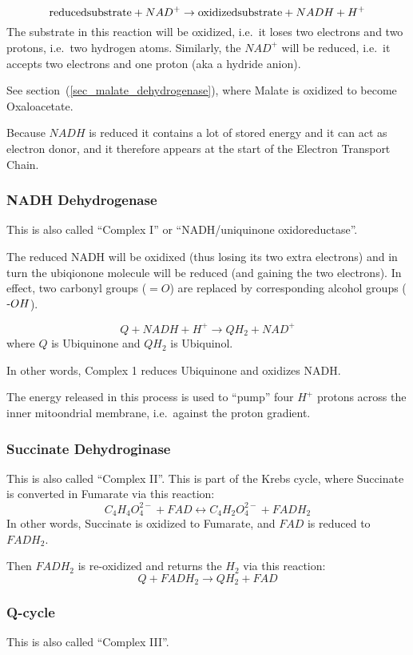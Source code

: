 \documentclass{article}
\def\mhyphen{{\hbox{-}}}
\begin{document}
\[
    {\rm reduced substrate} + NAD^+ \rightarrow {\rm oxidized substrate} + NADH + H^+
\]
The substrate in this reaction will be oxidized, i.e.\ it loses two electrons and two
protons, i.e.\ two hydrogen atoms. Similarly, the $NAD^+$ will be reduced, i.e.\ it
accepts two electrons and one proton (aka a hydride anion).

See section~(\ref{sec_malate_dehydrogenase}), where Malate is oxidized to become
Oxaloacetate.

Because $NADH$ is reduced it contains a lot of stored energy and it can act as electron
donor, and it therefore appears at the start of the Electron Transport Chain.

\subsubsection{NADH Dehydrogenase}
This is also called ``Complex I'' or ``NADH/uniquinone oxidoreductase''.

The reduced NADH will be oxidixed (thus losing its two extra electrons) and in turn
the ubiqionone molecule will be reduced (and gaining the two electrons).
In effect, two carbonyl groups ($=O$) are replaced by corresponding alcohol groups
(${\mhyphen}OH$).

\[
    Q + NADH + H^+ \rightarrow QH_2 + NAD^+
\]
where $Q$ is Ubiquinone and $QH_2$ is Ubiquinol.

In other words, Complex 1 reduces Ubiquinone and oxidizes NADH\@.

The energy released in this process is used to ``pump'' four $H^+$ protons across the
inner mitoondrial membrane, i.e.\ against the proton gradient.

\subsubsection{Succinate Dehydroginase}
This is also called ``Complex II''. This is part of the Krebs cycle, where
Succinate is converted in Fumarate via this reaction:
\[
    C_4H_4O_4^{2-} + FAD \leftrightarrow C_4H_2O_4^{2-} + FADH_2
\]
In other words, Succinate is oxidized to Fumarate, and $FAD$ is reduced to $FADH_2$.

Then $FADH_2$ is re-oxidized and returns the $H_2$ via this reaction:
\[
    Q + FADH_2 \rightarrow QH_2 + FAD
\]

\subsubsection{Q-cycle}
This is also called ``Complex III''.
\end{document}
